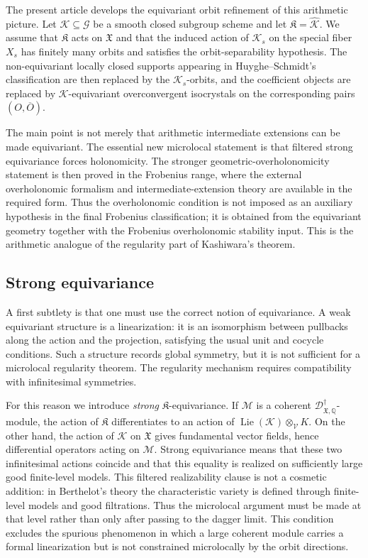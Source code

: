 \documentclass[11pt]{amsart}
\theoremstyle{plain}
\theoremstyle{definition}
\theoremstyle{remark}
\begin{document}
The present article develops the equivariant orbit refinement of this
arithmetic picture.  Let \(\mathcal K\subseteq\mathcal G\) be a smooth closed
subgroup scheme and let \(\mathfrak K=\widehat{\mathcal K}\).  We assume that
\(\mathfrak K\) acts on \(\mathfrak X\) and that the induced action of
\(\mathcal K_s\) on the special fiber \(X_s\) has finitely many orbits and satisfies the orbit-separability hypothesis.  The
non-equivariant locally closed supports appearing in Huyghe--Schmidt's
classification are then replaced by the \(\mathcal K_s\)-orbits, and the
coefficient objects are replaced by \(\mathcal K\)-equivariant overconvergent
isocrystals on the corresponding pairs \((O,\overline O)\).

The main point is not merely that arithmetic intermediate extensions can be
made equivariant.  The essential new microlocal statement is that filtered strong equivariance
forces holonomicity.  The stronger geometric-overholonomicity statement is then
proved in the Frobenius range, where the external overholonomic formalism and
intermediate-extension theory are available in the required form.  Thus the
overholonomic condition is not imposed as an auxiliary hypothesis in the final
Frobenius classification; it is obtained from the equivariant geometry together
with the Frobenius overholonomic stability input.  This is the arithmetic
analogue of the regularity part of Kashiwara's theorem.

\subsection*{Strong equivariance}

A first subtlety is that one must use the correct notion of equivariance.
A weak equivariant structure is a linearization: it is an isomorphism between
pullbacks along the action and the projection, satisfying the usual unit and
cocycle conditions.  Such a structure records global symmetry, but it is not
sufficient for a microlocal regularity theorem.  The regularity mechanism
requires compatibility with infinitesimal symmetries.

For this reason we introduce \emph{strong} \(\mathfrak K\)-equivariance.  If
\(\mathcal M\) is a coherent
\(\mathscr D^\dagger_{\mathfrak X,\mathbb Q}\)-module, the action of
\(\mathfrak K\) differentiates to an action of
\(\operatorname{Lie}(\mathcal K)\otimes_{\mathcal V}K\).  On the other hand,
the action of \(\mathcal K\) on \(\mathfrak X\) gives fundamental vector fields,
hence differential operators acting on \(\mathcal M\).  Strong equivariance
means that these two infinitesimal actions coincide and that this equality is
realized on sufficiently large good finite-level models.  This filtered
realizability clause is not a cosmetic addition: in Berthelot's theory the
characteristic variety is defined through finite-level models and good
filtrations.  Thus the microlocal argument must be made at that level rather
than only after passing to the dagger limit.  This condition excludes the
spurious phenomenon in which a large coherent module carries a formal
linearization but is not constrained microlocally by the orbit directions.
\end{document}
